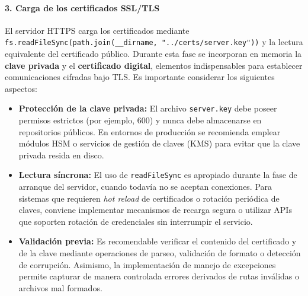 \paragraph{3. Carga de los certificados SSL/TLS}
El servidor HTTPS carga los certificados mediante \texttt{fs.readFileSync(path.join(\_\_dirname, "../certs/server.key"))} y la lectura equivalente del certificado público. Durante esta fase se incorporan en memoria la \textbf{clave privada} y el \textbf{certificado digital}, elementos indispensables para establecer comunicaciones cifradas bajo TLS. Es importante considerar los siguientes aspectos:

\begin{itemize}
  \item \textbf{Protección de la clave privada:} El archivo \texttt{server.key} debe poseer permisos estrictos (por ejemplo, 600) y nunca debe almacenarse en repositorios públicos. En entornos de producción se recomienda emplear módulos HSM o servicios de gestión de claves (KMS) para evitar que la clave privada resida en disco.
  
  \item \textbf{Lectura síncrona:} El uso de \texttt{readFileSync} es apropiado durante la fase de arranque del servidor, cuando todavía no se aceptan conexiones. Para sistemas que requieren \textit{hot reload} de certificados o rotación periódica de claves, conviene implementar mecanismos de recarga segura o utilizar APIs que soporten rotación de credenciales sin interrumpir el servicio.
  
  \item \textbf{Validación previa:} Es recomendable verificar el contenido del certificado y de la clave mediante operaciones de parseo, validación de formato o detección de corrupción. Asimismo, la implementación de manejo de excepciones permite capturar de manera controlada errores derivados de rutas inválidas o archivos mal formados.
\end{itemize}


